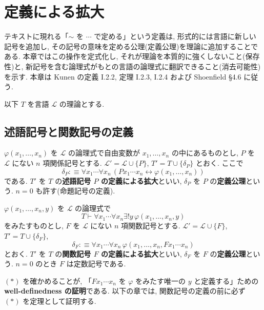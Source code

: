 \chapter{定義による拡大}\label{ch:definitions}

テキストに現れる「$\sim$ を $\cdots$ で定める」という定義は, 形式的には言語に新しい記号を追加し, その記号の意味を定める公理(定義公理)を理論に追加することである. 本章ではこの操作を定式化し, それが理論を本質的に強くしないこと(保存性)と, 新記号を含む論理式がもとの言語の論理式に翻訳できること(消去可能性)を示す. 本章は Kunen \cite{kunen2011} の定義 I.2.2, 定理 I.2.3, I.2.4 および Shoenfield \cite{shoenfield} \S 4.6 に従う.

以下 $T$ を言語 $\mathcal{L}$ の理論とする.

\section{述語記号と関数記号の定義}

\begin{dfn}[述語記号の定義]\label{dfn:pred-def}
  $\varphi(x_1, \ldots, x_n)$ を $\mathcal{L}$ の論理式で自由変数が $x_1,\ldots,x_n$ の中にあるものとし, $P$ を $\mathcal{L}$ にない $n$ 項関係記号とする. $\mathcal{L}' = \mathcal{L} \cup \{P\}$, $T' = T \cup \{\delta_P\}$ とおく. ここで
  \[ \delta_P :\equiv \forall x_1 \cdots \forall x_n\,(P x_1 \cdots x_n \leftrightarrow \varphi(x_1, \ldots, x_n)) \]
  である. $T'$ を $T$ の\textbf{述語記号 $P$ の定義による拡大}といい, $\delta_P$ を $P$ の\textbf{定義公理}という. $n = 0$ も許す(命題記号の定義).
\end{dfn}

\begin{dfn}[関数記号の定義]\label{dfn:func-def}
  $\varphi(x_1,\ldots,x_n,y)$ を $\mathcal{L}$ の論理式で
  \[ T \vdash \forall x_1 \cdots \forall x_n \exists ! y\, \varphi(x_1, \ldots, x_n, y) \tag{$\ast$}\]
  をみたすものとし, $F$ を $\mathcal{L}$ にない $n$ 項関数記号とする. $\mathcal{L}' = \mathcal{L} \cup \{F\}$, $T' = T \cup \{\delta_F\}$,
  \[ \delta_F :\equiv \forall x_1 \cdots \forall x_n\, \varphi(x_1, \ldots, x_n, F x_1 \cdots x_n) \]
  とおく. $T'$ を $T$ の\textbf{関数記号 $F$ の定義による拡大}といい, $\delta_F$ を $F$ の\textbf{定義公理}という. $n = 0$ のとき $F$ は定数記号である.
\end{dfn}

$(\ast)$ を確かめることが, 「$F x_1 \cdots x_n$ を $\varphi$ をみたす唯一の $y$ と定義する」ための\textbf{well-definedness の証明}である. 以下の章では, 関数記号の定義の前に必ず $(\ast)$ を定理として証明する.

